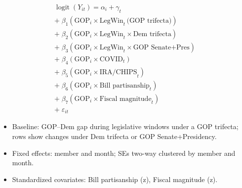 \documentclass[preview,border=14pt,11pt,fleqn,leqno]{standalone}
\begin{document}
\begin{minipage}{0.92\linewidth}
\begin{equation}
\tag{3}
\begin{aligned}
\operatorname{logit}(Y_{it}) = \alpha_i + \gamma_t \\ +\; \beta_{1}(\text{GOP}_i\!\times\!\text{LegWin}_t\,\text{(GOP trifecta)}) \\ +\; \beta_{2}(\text{GOP}_i\!\times\!\text{LegWin}_t\!\times\!\text{Dem trifecta}) \\ +\; \beta_{3}(\text{GOP}_i\!\times\!\text{LegWin}_t\!\times\!\text{GOP Senate+Pres}) \\ +\; \beta_{4}(\text{GOP}_i\!\times\!\text{COVID}_t) \\ +\; \beta_{5}(\text{GOP}_i\!\times\!\text{IRA/CHIPS}_t) \\ +\; \beta_{6}(\text{GOP}_i\!\times\!\text{Bill partisanship}_t) \\ +\; \beta_{7}(\text{GOP}_i\!\times\!\text{Fiscal magnitude}_t) \\ +\; \varepsilon_{it}
\end{aligned}
\end{equation}
\vspace{0.25em}
{\itshape
\begin{itemize}[leftmargin=*,nosep]
\item Baseline: GOP–Dem gap during legislative windows under a GOP trifecta; rows show changes under Dem trifecta or GOP Senate+Presidency.
\item Fixed effects: member and month; SEs two-way clustered by member and month.
\item Standardized covariates: Bill partisanship (z), Fiscal magnitude (z).
\end{itemize}
}
\end{minipage}
\end{document}
